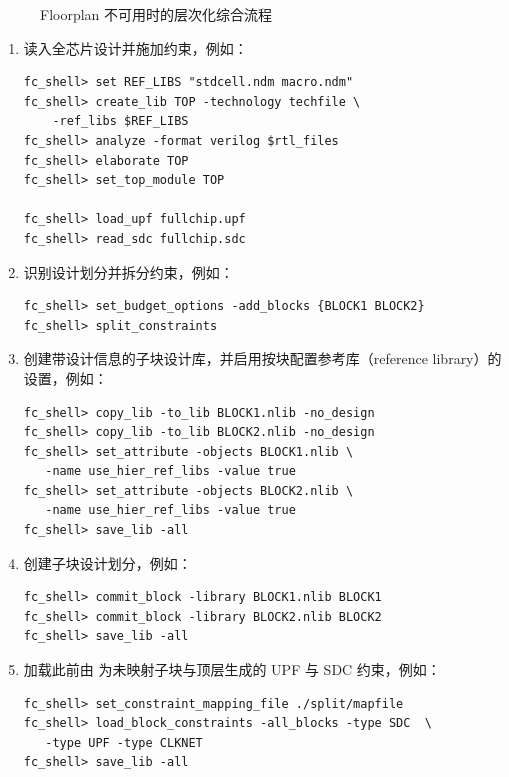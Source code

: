 \begin{figure}[htbp]
\centering
{}
\caption{Floorplan 不可用时的层次化综合流程}
\label{fig:hier-synth-no-fp}
\end{figure}

\begin{enumerate}
  \item 读入全芯片设计并施加约束，例如：
\begin{lstlisting}
fc_shell> set REF_LIBS "stdcell.ndm macro.ndm"
fc_shell> create_lib TOP -technology techfile \
    -ref_libs $REF_LIBS
fc_shell> analyze -format verilog $rtl_files
fc_shell> elaborate TOP
fc_shell> set_top_module TOP

fc_shell> load_upf fullchip.upf
fc_shell> read_sdc fullchip.sdc
\end{lstlisting}

  \item 识别设计划分并拆分约束，例如：
\begin{lstlisting}
fc_shell> set_budget_options -add_blocks {BLOCK1 BLOCK2}
fc_shell> split_constraints
\end{lstlisting}

  \item 创建带设计信息的子块设计库，并启用按块配置参考库（reference library）的设置，例如：
\begin{lstlisting}
fc_shell> copy_lib -to_lib BLOCK1.nlib -no_design
fc_shell> copy_lib -to_lib BLOCK2.nlib -no_design
fc_shell> set_attribute -objects BLOCK1.nlib \
   -name use_hier_ref_libs -value true
fc_shell> set_attribute -objects BLOCK2.nlib \
   -name use_hier_ref_libs -value true
fc_shell> save_lib -all
\end{lstlisting}

  \item 创建子块设计划分，例如：
\begin{lstlisting}
fc_shell> commit_block -library BLOCK1.nlib BLOCK1
fc_shell> commit_block -library BLOCK2.nlib BLOCK2
fc_shell> save_lib -all
\end{lstlisting}

  \item 加载此前由  为未映射子块与顶层生成的 UPF 与 SDC 约束，例如：
\begin{lstlisting}
fc_shell> set_constraint_mapping_file ./split/mapfile
fc_shell> load_block_constraints -all_blocks -type SDC  \
   -type UPF -type CLKNET
fc_shell> save_lib -all
\end{lstlisting}


\end{enumerate}
